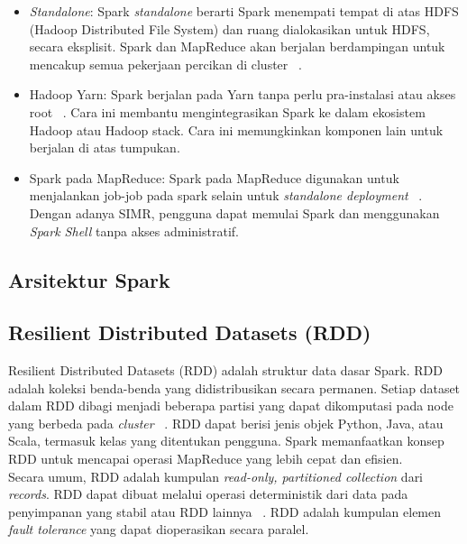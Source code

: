 \begin{itemize}

\item \textit{Standalone}: Spark \textit{standalone} berarti Spark menempati tempat di atas HDFS (Hadoop Distributed File System) dan ruang dialokasikan untuk HDFS, secara eksplisit. Spark dan MapReduce akan berjalan berdampingan untuk mencakup semua pekerjaan percikan di cluster ~\cite{holdenkarau:07:ls}.

\item Hadoop Yarn: Spark berjalan pada Yarn tanpa perlu pra-instalasi atau akses root ~\cite{holdenkarau:07:ls}. Cara ini membantu mengintegrasikan Spark ke dalam ekosistem Hadoop atau Hadoop stack. Cara ini memungkinkan komponen lain untuk berjalan di atas tumpukan.

\item Spark pada MapReduce: Spark pada MapReduce digunakan untuk menjalankan job-job pada spark selain untuk \textit{standalone deployment} ~\cite{holdenkarau:07:ls}. Dengan adanya SIMR, pengguna dapat memulai Spark dan menggunakan \textit{Spark Shell} tanpa akses administratif.\\

\end{itemize}

\subsection{Arsitektur Spark}

\subsection{Resilient Distributed Datasets (RDD)}

Resilient Distributed Datasets (RDD) adalah struktur data dasar Spark. RDD adalah koleksi benda-benda yang didistribusikan secara permanen. Setiap dataset dalam RDD dibagi menjadi beberapa partisi yang dapat dikomputasi pada node yang berbeda pada \textit{cluster} ~\cite{holdenkarau:07:ls}. RDD dapat berisi jenis objek Python, Java, atau Scala, termasuk kelas yang ditentukan pengguna. Spark memanfaatkan konsep RDD untuk mencapai operasi MapReduce yang lebih cepat dan efisien. ~\cite{holdenkarau:07:ls}\\

Secara umum, RDD adalah kumpulan \textit{read-only, partitioned collection} dari \textit{records}. RDD dapat dibuat melalui operasi deterministik dari data pada penyimpanan yang stabil atau RDD lainnya ~\cite{holdenkarau:07:ls}. RDD adalah kumpulan elemen \textit{fault tolerance} yang dapat dioperasikan secara paralel.\\


